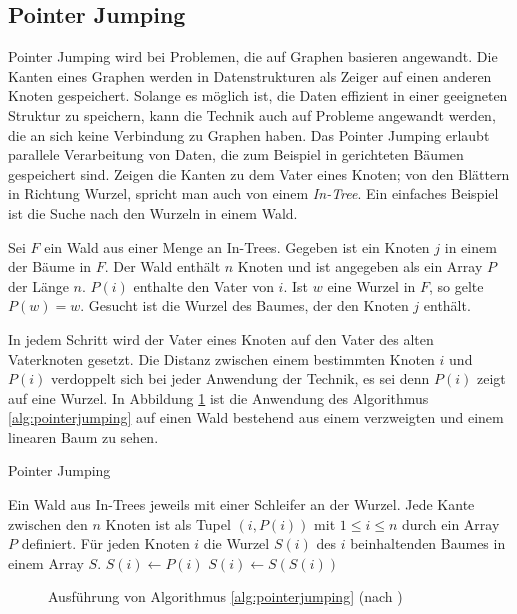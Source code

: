 \subsection{Pointer Jumping}
Pointer Jumping wird bei Problemen, die auf Graphen basieren angewandt.
Die Kanten eines Graphen werden in Datenstrukturen als Zeiger auf einen anderen
Knoten gespeichert.
Solange es möglich ist, die Daten effizient in einer geeigneten Struktur zu
speichern, kann die Technik auch auf Probleme angewandt werden, die an sich
keine Verbindung zu Graphen haben.
Das Pointer Jumping erlaubt parallele Verarbeitung von Daten, die zum Beispiel
in gerichteten Bäumen gespeichert sind.
Zeigen die Kanten zu dem Vater eines Knoten; von den Blättern in Richtung
Wurzel, spricht man auch von einem \emph{In-Tree}.
Ein einfaches Beispiel ist die Suche nach den Wurzeln in einem Wald.
%
\begin{problem}
    Sei $F$ ein Wald aus einer Menge an In-Trees.
    Gegeben ist ein Knoten $j$ in einem der Bäume in $F$.
    Der Wald enthält $n$ Knoten und ist angegeben als ein Array $P$ der Länge
    $n$.
    $P(i)$ enthalte den Vater von $i$.
    Ist $w$ eine Wurzel in $F$, so gelte $P(w) = w$.
    Gesucht ist die Wurzel des Baumes, der den Knoten $j$ enthält.
\end{problem}
%
In jedem Schritt wird der Vater eines Knoten auf den Vater des alten
Vaterknoten gesetzt.
Die Distanz zwischen einem bestimmten Knoten $i$ und $P(i)$ verdoppelt sich bei
jeder Anwendung der Technik, es sei denn $P(i)$ zeigt auf eine Wurzel.
In Abbildung \ref{fig:pointerjumping} ist die Anwendung des Algorithmus
\ref{alg:pointerjumping} auf einen Wald bestehend aus einem verzweigten und
einem linearen Baum zu sehen.
%
\begin{algorithm}
    \caption{Pointer Jumping \cite[S.52]{jaja}}
    \label{alg:pointerjumping}
    \begin{algorithmic}[1]
    \Require Ein Wald aus In-Trees jeweils mit einer Schleifer an der Wurzel.
        Jede Kante zwischen den $n$ Knoten ist als Tupel $(i, P(i))$ mit
        $1 \leq i \leq n$ durch ein Array $P$ definiert.
    \Ensure Für jeden Knoten $i$ die Wurzel $S(i)$ des $i$ beinhaltenden
        Baumes in einem Array $S$.
        \State $S(i) \gets P(i)$
            \State $S(i) \gets S(S(i))$
        \EndWhile
    \EndParDo
    \end{algorithmic}
\end{algorithm}
%
\begin{figure}
    \centering
    \subfloat[]{}
    \subfloat[]{}
    \newline
    \subfloat[]{}
    \caption{Ausführung von Algorithmus \ref{alg:pointerjumping}
    (nach \cite[S.54]{jaja})}
    \label{fig:pointerjumping}
\end{figure}
\cite[S.52ff]{jaja}
